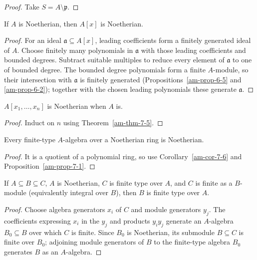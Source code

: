 \begin{proof}
Take $S=A\setminus\mathfrak{p}$.
\end{proof}
\begin{theorem}
\label{am-thm-7-5}
\uses{}
If $A$ is Noetherian, then $A[x]$ is Noetherian.
\end{theorem}
\begin{proof}
For an ideal $\mathfrak{a}\subseteq A[x]$, leading coefficients form a finitely
generated ideal of $A$.  Choose finitely many polynomials in $\mathfrak{a}$ with
those leading coefficients and bounded degrees.  Subtract suitable multiples
to reduce every element of $\mathfrak{a}$ to one of bounded degree.  The bounded
degree polynomials form a finite $A$-module, so their intersection with
$\mathfrak{a}$ is finitely generated (Propositions~\ref{am-prop-6-5} and
\ref{am-prop-6-2}); together with the chosen leading polynomials these generate
$\mathfrak{a}$.
\end{proof}
\begin{corollary}
\label{am-cor-7-6}
\uses{}
$A[x_1,\ldots,x_n]$ is Noetherian when $A$ is.
\end{corollary}
\begin{proof}
Induct on $n$ using Theorem~\ref{am-thm-7-5}.
\end{proof}
\begin{corollary}
\label{am-cor-7-7}
\uses{}
Every finite-type $A$-algebra over a Noetherian ring is Noetherian.
\end{corollary}
\begin{proof}
It is a quotient of a polynomial ring, so use Corollary~\ref{am-cor-7-6} and
Proposition~\ref{am-prop-7-1}.
\end{proof}
\begin{proposition}
\label{am-prop-7-8}
\uses{}
If $A\subseteq B\subseteq C$, $A$ is Noetherian, $C$ is finite type over $A$,
and $C$ is finite as a $B$-module (equivalently integral over $B$), then $B$ is
finite type over $A$.
\end{proposition}
\begin{proof}
Choose algebra generators $x_i$ of $C$ and module generators $y_j$.  The
coefficients expressing $x_i$ in the $y_j$ and products $y_iy_j$ generate an
$A$-algebra $B_0\subseteq B$ over which $C$ is finite.  Since $B_0$ is
Noetherian, its submodule $B\subseteq C$ is finite over $B_0$; adjoining module
generators of $B$ to the finite-type algebra $B_0$ generates $B$ as an
$A$-algebra.
\end{proof}
